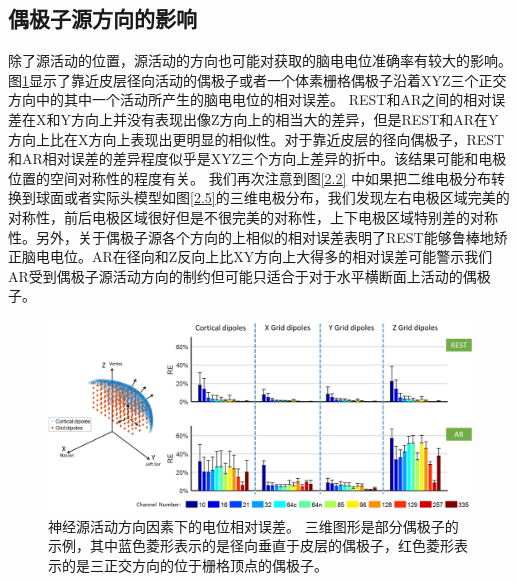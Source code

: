\subsection{偶极子源方向的影响}
除了源活动的位置，源活动的方向也可能对获取的脑电电位准确率有较大的影响。图\ref{2.7}显示了靠近皮层径向活动的偶极子或者一个体素栅格偶极子沿着XYZ三个正交方向中的其中一个活动所产生的脑电电位的相对误差。 REST和AR之间的相对误差在X和Y方向上并没有表现出像Z方向上的相当大的差异，但是REST和AR在Y方向上比在X方向上表现出更明显的相似性。对于靠近皮层的径向偶极子，REST和AR相对误差的差异程度似乎是XYZ三个方向上差异的折中。该结果可能和电极位置的空间对称性的程度有关。 我们再次注意到图\ref{2.2}
中如果把二维电极分布转换到球面或者实际头模型如图\ref{2.5}的三维电极分布，我们发现左右电极区域完美的对称性，前后电极区域很好但是不很完美的对称性，上下电极区域特别差的对称性。另外，关于偶极子源各个方向的上相似的相对误差表明了REST能够鲁棒地矫正脑电电位。AR在径向和Z反向上比XY方向上大得多的相对误差可能警示我们AR受到偶极子源活动方向的制约但可能只适合于对于水平横断面上活动的偶极子。
\begin{figure}[h!]
	\centering
	\includegraphics[width=15cm]{pic/JNE/figure7.png}
	\caption{神经源活动方向因素下的电位相对误差。 三维图形是部分偶极子的示例，其中蓝色菱形表示的是径向垂直于皮层的偶极子，红色菱形表示的是三正交方向的位于栅格顶点的偶极子。}
	\label{2.7}
\end{figure}

